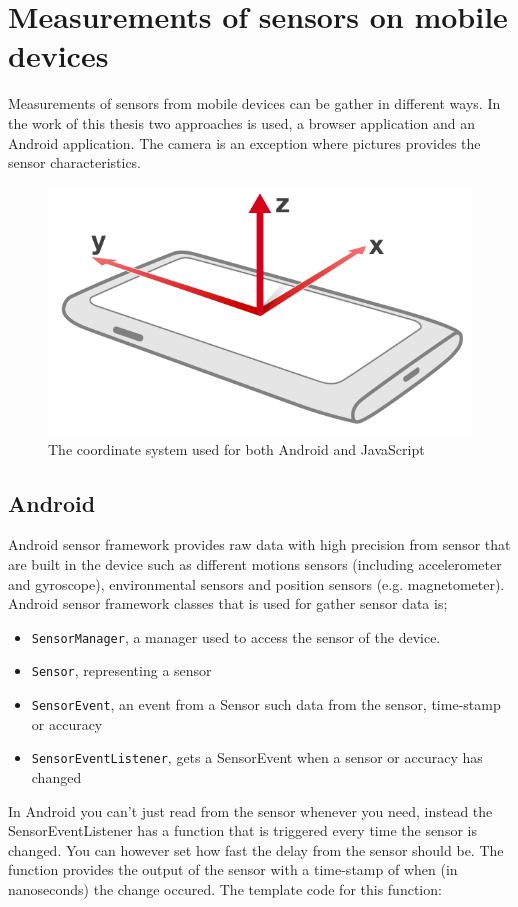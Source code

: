 \section{Measurements of sensors on mobile devices}\label{sec:charMeasureSensor}
Measurements of sensors from mobile devices can be gather in different ways. In the work of this thesis two approaches is used, a browser application and an Android application. The camera is an exception where pictures provides the sensor characteristics.
\begin{figure}[H]
	\centering
    \includegraphics[scale=0.2]{img/device-axes}
    \caption{The coordinate system used for both Android and JavaScript\cite[]{sensor:W3C}}
  \label{fig:device-axes}
\end{figure}

\subsection{Android}\label{subsec:Android}
Android sensor framework provides raw data with high precision from sensor that are built in the device such as different motions sensors (including accelerometer and gyroscope), environmental sensors and position sensors (e.g. magnetometer). \cite[]{android:sensor}
Android sensor framework classes that is used for gather sensor data is; 
\begin{itemize}
	\item[] \texttt{SensorManager}, a manager used to access the sensor of the device. 
	\item[] \texttt{Sensor}, representing a sensor
	\item[] \texttt{SensorEvent}, an event from a Sensor such data from the sensor, time-stamp or accuracy
	\item[] \texttt{SensorEventListener}, gets a SensorEvent when a sensor or accuracy has changed 
\end{itemize}
In Android you can't just read from the sensor whenever you need, instead the SensorEventListener has a function that is triggered every time the sensor is changed. You can however set how fast the delay from the sensor should be. The function provides the output of the sensor with a time-stamp of when (in nanoseconds) the change occured. The template code for this function:
\label{code:androidSensor}
\cite[]{android:sensorEvent} 




